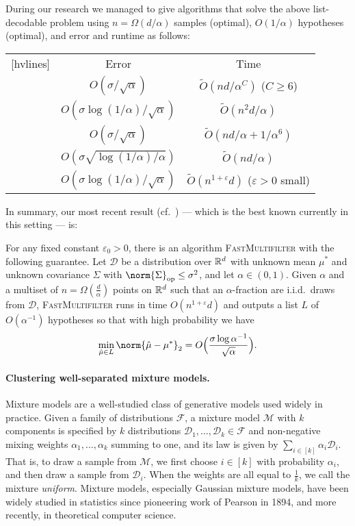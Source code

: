 During our research we managed to give algorithms that solve the above list-decodable problem using
$n = \Omega(d/\alpha)$ samples (optimal), $O(1/\alpha)$ hypotheses (optimal), and error and runtime as follows:
\begin{center}
  \begin{NiceTabular}{ccc}[hvlines]
    & Error & Time \\
    \cite{CMY} & $O(\sigma/\sqrt{\alpha})$ & $\widetilde{O}(nd/\alpha^C)$ ($C\geq6$) \\
    \cite{robstat1} & $O(\sigma\log(1/\alpha)/\sqrt{\alpha})$ & $\widetilde{O}(n^2d/\alpha)$ \\
     & $O(\sigma/\sqrt{\alpha})$ & $\widetilde{O}(nd/\alpha + 1/\alpha^6)$ \\
    & $O(\sigma\sqrt{\log(1/\alpha)/\alpha})$ & $\widetilde{O}(nd/\alpha)$ \\
    \cite{robstat3} & $O(\sigma\log(1/\alpha)/\sqrt{\alpha})$ & $\widetilde{O}(n^{1+\varepsilon}d)$ ($\varepsilon>0$ small) \\
  \end{NiceTabular}
\end{center}

In summary, our most recent result (cf.\ \cite[Thm.~6]{robstat3}) --- which is the best known currently in this setting --- is:
\begin{theorem}[informal]
For any fixed constant $\varepsilon_0 > 0$, there is an algorithm \textsc{FastMultifilter} with the following guarantee.
Let $\mathcal{D}$ be a distribution over $\mathbb{R}^d$ with unknown mean $\mu^{*}$ and unknown covariance $\Sigma$ with
$\norm{\Sigma}_{\mathrm{op}} \leq \sigma^2$, and let $\alpha \in (0, 1)$.
Given $\alpha$ and a multiset of $n = \Omega(\frac d \alpha)$ points on $\mathbb{R}^d$
such that an $\alpha$-fraction are i.i.d.\ draws from $\mathcal{D}$, \textsc{FastMultifilter} runs in time $O(n^{1 + \varepsilon} d)$ and
outputs a list $L$ of $O(\alpha^{-1})$ hypotheses so that with high probability
we have
\[\min_{\hat\mu \in L} \norm{\hat\mu - \mu^{*}}_2 = O \Bigl(\frac{\sigma \log \alpha^{-1}}{\sqrt{\alpha}}\Bigr).\]
\end{theorem}


\paragraph{Clustering well-separated mixture models.}
Mixture models are a well-studied class of generative models used widely in practice. Given a family of distributions $\mathcal{F}$, a mixture model $\mathcal{M}$ with $k$ components is specified by $k$ distributions $\mathcal{D}_1, \dotsc, \mathcal{D}_k \in \mathcal{F}$ and non-negative mixing weights $\alpha_1, \dotsc, \alpha_k$ summing to one, and its law is given by $\sum_{i \in [k]} \alpha_i \mathcal{D}_i$.
That is, to draw a sample from $\mathcal{M}$, we first choose $i \in [k]$ with probability $\alpha_i$, and
then draw a sample from $\mathcal{D}_i$. When the weights are all equal to $\frac 1 k$, we call the mixture \emph{uniform}.
Mixture models, especially Gaussian mixture models, have been widely studied in statistics since pioneering
work of Pearson in 1894, and more recently, in theoretical computer science.

